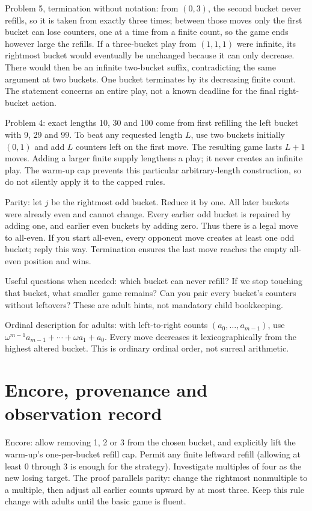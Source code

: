 \documentclass[11pt,letterpaper]{article}
\begin{document}
Problem 5, termination without notation: from $(0,3)$, the second bucket never refills, so it is taken from exactly three times; between those moves only the first bucket can lose counters, one at a time from a finite count, so the game ends however large the refills. If a three-bucket play from $(1,1,1)$ were infinite, its rightmost bucket would eventually be unchanged because it can only decrease. There would then be an infinite two-bucket suffix, contradicting the same argument at two buckets. One bucket terminates by its decreasing finite count. The statement concerns an entire play, not a known deadline for the final right-bucket action.

Problem 4: exact lengths 10, 30 and 100 come from first refilling the left bucket with 9, 29 and 99. To beat any requested length $L$, use two buckets initially $(0,1)$ and add $L$ counters left on the first move. The resulting game lasts $L+1$ moves. Adding a larger finite supply lengthens a play; it never creates an infinite play. The warm-up cap prevents this particular arbitrary-length construction, so do not silently apply it to the capped rules.

Parity: let $j$ be the rightmost odd bucket. Reduce it by one. All later buckets were already even and cannot change. Every earlier odd bucket is repaired by adding one, and earlier even buckets by adding zero. Thus there is a legal move to all-even. If you start all-even, every opponent move creates at least one odd bucket; reply this way. Termination ensures the last move reaches the empty all-even position and wins.

Useful questions when needed: which bucket can never refill? If we stop touching that bucket, what smaller game remains? Can you pair every bucket's counters without leftovers? These are adult hints, not mandatory child bookkeeping.

Ordinal description for adults: with left-to-right counts $(a_0,\ldots,a_{m-1})$, use $\omega^{m-1}a_{m-1}+\cdots+\omega a_1+a_0$. Every move decreases it lexicographically from the highest altered bucket. This is ordinary ordinal order, not surreal arithmetic.
\newpage
\section*{Encore, provenance and observation record}
Encore: allow removing 1, 2 or 3 from the chosen bucket, and explicitly lift the warm-up's one-per-bucket refill cap. Permit any finite leftward refill (allowing at least 0 through 3 is enough for the strategy). Investigate multiples of four as the new losing target. The proof parallels parity: change the rightmost nonmultiple to a multiple, then adjust all earlier counts upward by at most three. Keep this rule change with adults until the basic game is fluent.
\end{document}

